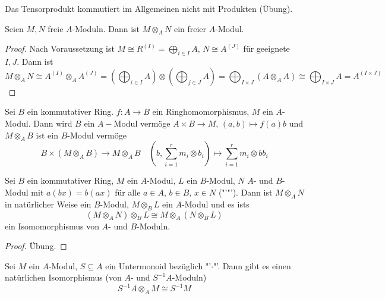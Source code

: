 \begin{anm}
	Das Tensorprodukt kommutiert im Allgemeinen nicht mit Produkten (Übung).
\end{anm}
\begin{fo}\label{13.8}
	Seien $M,N$ freie $A$-Moduln. Dann ist $M\otimes_A N$ ein freier $A$-Modul.
\end{fo}
\begin{proof}
	Nach Voraussetzung ist $M \cong R^{(I)}  =\bigoplus_{i\in I} A, \, N \cong A^{(J)}$ für geeignete $I,J$. Dann ist 
	$$M \otimes_A N \cong A^{(I)} \otimes_A A^{(J)} = \left( \bigoplus_{i\in I} A\right)\otimes \left(\bigoplus_{j\in J}A\right) = \bigoplus_{I\times J}(A \otimes_A A) \cong \bigoplus_{I\times J}A = A^{(I \times J)}$$
\end{proof}
\begin{bem}\label{13.9}
	Sei $B$ ein kommutativer Ring. $f:A\to B$ ein Ringhomomorphismus, $M$ ein $A$-Modul. Dann wird $B$ ein $A-$Modul vermöge $A\times B \to M, \, (a,b) \mapsto f(a) b$ und $M \otimes_AB$ ist ein $B$-Modul vermöge 
	$$B \times (M \otimes_A B)\to M \otimes_A B\quad(b, \sum_{i=1}^r m_i \otimes b_i)\mapsto \sum_{i=1}^r m_i \otimes b b_i$$
	
\end{bem}
\begin{bem}\label{13.10}
	Sei $B$ ein kommutativer Ring, $M$ ein $A$-Modul, $L$ ein $B$-Modul, $N$ $A$- und $B$-Modul mit $a(b x) = b(ax)$ für alle $a\in A, \, b\in B, \, x\in N$ ("'"'). Dann ist $M \otimes_AN$ in natürlicher Weise ein $B$-Modul, $M\otimes_BL$ ein $A$-Modul und es ists 
	$$(M \otimes_A N) \otimes_B L \cong M \otimes_A(N \otimes_B L)$$
	ein Isomomorphismus von $A$- und $B$-Moduln.
\end{bem}
\begin{proof}
	Übung.
\end{proof}
\begin{bem}\label{13.11}
	Sei $M$ ein $A$-Modul, $S\subseteq A$ ein Untermonoid bezüglich "'$\cdot$"'. Dann gibt es einen natürlichen Isomorphismus (von $A$- und $S^{-1}A$-Moduln)
	$$S^{-1}A \otimes_AM\cong S^{-1}M$$
\end{bem}
